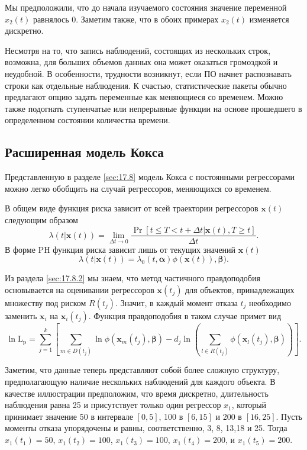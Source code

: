 Мы предположили, что до начала изучаемого состояния значение переменной $x_2(t)$ равнялось 0. Заметим также, что в обоих примерах $x_2(t)$ изменяется дискретно.

Несмотря на то, что запись наблюдений, состоящих из нескольких строк, возможна, для больших объемов данных она может оказаться громоздкой и неудобной. В особенности, трудности возникнут, если ПО начнет распознавать строки как отдельные наблюдения. К счастью, статистические пакеты обычно предлагают опцию задать переменные как меняющиеся со временем.
Можно также подогнать ступенчатые или непрерывные функции на основе прошедшего в определенном состоянии количества времени. %


\subsection{Расширенная модель Кокса}\label{sec:17.9.1}

Представленную в разделе \ref{sec:17.8} модель Кокса с постоянными регрессорами можно легко обобщить на случай регрессоров, меняющихся со временем.

В общем виде функция риска зависит от всей траектории регрессоров $\mathbf{x}(t)$ следующим образом
        $$\lambda(t|\mathbf{x}(t))=\lim_{\Delta t\rightarrow0}\frac{\Pr[t\le T<t+\Delta t|\mathbf{x}(t),T\ge t]}{\Delta t}.$$
В форме PH функция риска зависит лишь от текущих значений $\mathbf{x}(t)$
        $$\lambda(t|\mathbf{x}(t))=\lambda_0(t,\bm{\alpha})\phi(\mathbf{x}(t)),\bm{\beta}).$$

Из раздела \ref{sec:17.8.2} мы знаем, что метод частичного правдоподобия основывается на оценивании регрессоров $\mathbf{x}(t_j)$ для объектов, принадлежащих множеству под риском $R(t_j)$. Значит, в каждый момент отказа $t_j$ необходимо заменить $\mathbf{x}_i$ на $\mathbf{x}_i(t_j)$. Функция правдоподобия в таком случае примет вид
    $$\ln\mathrm{L_p}=\sum^{k}_{j=1}\left[\sum_{m\in D(t_j)}\ln\phi(\mathbf{x}_m(t_j),\bm{\beta})-d_j\ln\left(\sum_{l\in R(t_j)}\phi(\mathbf{x}_l(t_j),\bm{\beta})\right)\right].$$

Заметим, что данные теперь представляют собой более сложную структуру, предполагающую наличие нескольких наблюдений для каждого объекта. В качестве иллюстрации предположим, что время дискретно, длительность наблюдения равна 25 и присутствует только один регрессор $x_1$, который принимает значение 50 в интервале $[0,5]$, 100 в $[6,15]$ и 200 в $[16,25]$. Пусть моменты отказа упорядочены и равны, соответственно, 3, 8, 13,18 и 25. Тогда $x_1(t_1)=50$, $x_1(t_2)=100$, $x_1(t_3)=100$, $x_1(t_4)=200$, и $x_1(t_5)=200$.




